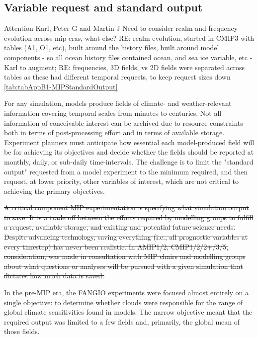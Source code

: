 \documentclass[gmd, preprint]{copernicus}
\def\cred#1{{\color{red}#1}}
\begin{document}
\subsection{Variable request and standard output}
\label{sec:CMIP6DR}
\cred{Attention Karl, Peter G and Martin J}
\cred{Need to consider realm and frequency evolution across mip eras, what else? RE: realm evolution, started in CMIP3 with tables (A1, O1, etc), built around the history files, built around model components - so all ocean history files contained ocean, and sea ice variable, etc - Karl to augment; RE: frequencies, 3D fields, vs 2D fields were separated across tables as these had different temporal requests, to keep request sizes down}
\autoref{tab:tabAppB1-MIPStandardOutput}

{\color{blue} For any simulation, models produce fields of climate- and weather-relevant information covering temporal scales from minutes to centuries. Not all information of conceivable interest can be archived due to resource constraints both in terms of post-processing effort and in terms of available storage. Experiment planners must anticipate how essential each model-produced field will be for achieving its objectives and decide whether the fields should be reported at monthly, daily, or sub-daily time-intervals. The challenge is to limit the "standard output" requested from a model experiment to the minimum required, and then request, at lower priority, other variables of interest, which are not critical to achieving the primary objectives.}

\sout{A critical component MIP experimentation is specifying what simulation output to save. It is a trade off between the efforts required by modelling groups to fulfill a request, available storage, and existing and potential future science needs. Despite advancing technology, saving everything (i.e., all prognostic variables at every timestep) has never been realistic. In AMIP1/2, CMIP1/2/2+/3/5, consideration, was made in consultation with MIP chairs and modelling groups about what questions or analyses will be pursued with a given simulation that dictates how much data is saved.} 

{\color{blue}In the pre-MIP era, the FANGIO experiments were focused almost entirely on a single objective: to determine whether clouds were responsible for the range of global climate sensitivities found in models. The narrow objective meant that the required output was limited to a few fields and, primarily, the global mean of those fields.}  
\end{document}
